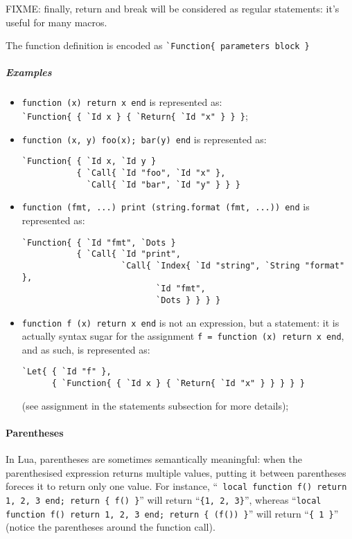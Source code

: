 FIXME: finally, return and break will be considered as regular
statements: it's useful for many macros.

The function definition is encoded as
\verb+`Function{ parameters block }+

\subparagraph{Examples}
\begin{itemize}

\item \verb+function (x) return x end+ is represented as:\\
  \verb+`Function{ { `Id x } { `Return{ `Id "x" } } }+;

\item \verb+function (x, y) foo(x); bar(y) end+ is represented as:
\begin{verbatim}
`Function{ { `Id x, `Id y } 
           { `Call{ `Id "foo", `Id "x" },
             `Call{ `Id "bar", `Id "y" } } }
\end{verbatim}
 
\item \verb+function (fmt, ...) print (string.format (fmt, ...)) end+
  is represented as:
\begin{verbatim}
`Function{ { `Id "fmt", `Dots } 
           { `Call{ `Id "print",
                    `Call{ `Index{ `Id "string", `String "format" }, 
                           `Id "fmt", 
                           `Dots } } } }
\end{verbatim}

\item \verb+function f (x) return x end+ is not an expression, but a
  statement: it is actually syntax sugar for the assignment
  \verb+f = function (x) return x end+, and as such, is represented
  as:
\begin{verbatim}
`Let{ { `Id "f" }, 
      { `Function{ { `Id x } { `Return{ `Id "x" } } } } }
\end{verbatim}
  (see assignment in the statements subsection for more details);

\end{itemize}

\paragraph{Parentheses}

In Lua, parentheses are sometimes semantically meaningful: when the
parenthesised expression returns multiple values, putting it between
parentheses foreces it to return only one value. For instance, ``{\tt
  local function f() return 1, 2, 3 end; return \{ f() \}}'' will
return ``{\tt\{1, 2, 3\}}'', whereas ``{\tt local function f() return
  1, 2, 3 end; return \{ (f()) \}}'' will return ``{\tt\{ 1 \}}''
(notice the parentheses around the function call).

